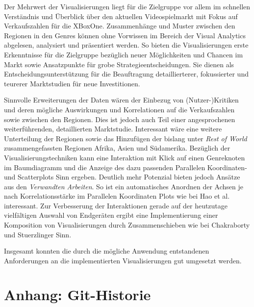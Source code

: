\documentclass[usegeometry=true]{scrartcl}
\begin{document}
Der Mehrwert der Visualisierungen liegt für die Zielgruppe vor allem im schnellen Verständnis und Überblick über den aktuellen Videospielmarkt mit Fokus auf Verkaufszahlen für die XBoxOne.
Zusammenhänge und Muster zwischen den Regionen in den Genres können ohne Vorwissen im Bereich der Visual Analytics abgelesen, analysiert und präsentiert werden.
So bieten die Visualisierungen erste Erkenntnisse für die Zielgruppe bezüglich neuer Möglichkeiten und Chancen im Markt sowie Ansatzpunkte für grobe Strategieentscheidungen. 
Sie dienen als Entscheidungsunterstützung für die Beauftragung detaillierterer, fokussierter und teurerer Marktstudien für neue Investitionen.

Sinnvolle Erweiterungen der Daten wären der Einbezug von (Nutzer-)Kritiken und deren mögliche Auswirkungen und Korrelationen auf die Verkaufszahlen sowie zwischen den Regionen.
Dies ist jedoch auch Teil einer angesprochenen weiterführenden, detaillierten Marktstudie.
Interessant wäre eine weitere Unterteilung der Regionen sowie das Hinzufügen der bislang unter \textit{Rest of World} zusammengefassten Regionen Afrika, Asien und Südamerika.
Bezüglich der Visualisierungstechniken kann eine Interaktion mit Klick auf einen Genreknoten im Baumdiagramm und die Anzeige des dazu passenden Parallelen Koordinaten- und Scatterplots Sinn ergeben.
Deutlich mehr Potenzial bieten jedoch Ansätze aus den \textit{Verwandten Arbeiten}. 
So ist ein automatisches Anordnen der Achsen je nach Korrelationsstärke im Parallelen Koordinaten Plots wie bei Hao et al. interessant.\cite{Hao.2007}
Zur Verbesserung der Interaktionen gerade auf der heutzutage vielfältigen Auswahl von Endgeräten ergibt eine Implementierung einer Komposition von Visualisierungen durch Zusammenschieben wie bei Chakraborty und Stuerzlinger Sinn.\cite{Chakraborty.2021}

Insgesamt konnten die durch die mögliche Anwendung entstandenen Anforderungen an die implementierten Visualisierungen gut umgesetzt werden.

\section*{Anhang: Git-Historie}

\printbibliography
\end{document}
